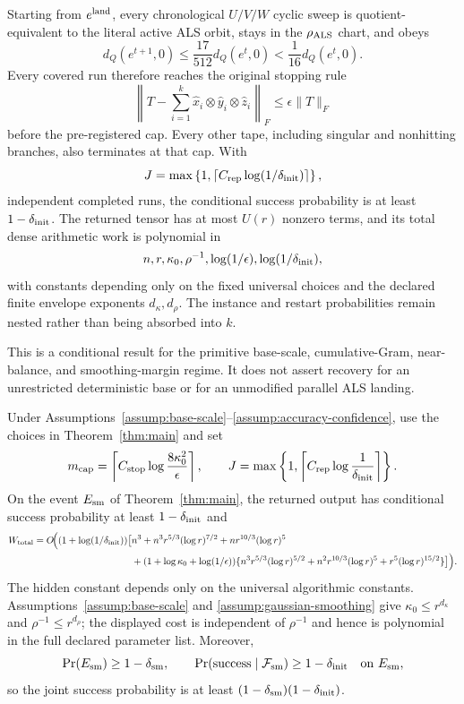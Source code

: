 \begin{theorem}
Starting from $e^{\rm land}$, every chronological $U/V/W$ cyclic sweep is
quotient-equivalent to the literal active ALS orbit, stays in the
$\rho_{\rm ALS}$ chart, and obeys
\[
 d_Q(e^{t+1},0)\le\frac{17}{512}d_Q(e^t,0)<\frac1{16}d_Q(e^t,0).
\]
Every covered run therefore reaches the original stopping rule
\[
 \left\|T-\sum_{i=1}^k
 \widehat x_i\otimes\widehat y_i\otimes\widehat z_i\right\|_F
 \le\epsilon\|T\|_F
\]
before the pre-registered cap. Every other tape, including singular and
nonhitting branches, also terminates at that cap. With
\[
 J=\max\left\{1,
 \left\lceil C_{\rm rep}\log(1/\delta_{\rm init})\right\rceil\right\},
\]
independent completed runs, the conditional success probability is at least
$1-\delta_{\rm init}$. The returned tensor has at most $U(r)$ nonzero terms,
and its total dense arithmetic work is polynomial in
\[
 n,r,\kappa _0,\rho^{-1},\log(1/\epsilon),
 \log(1/\delta_{\rm init}),
\]
with constants depending only on the fixed universal choices and the declared
finite envelope exponents $d_\kappa,d_\rho$. The instance and restart
probabilities remain nested rather than being absorbed into $k$.
\end{theorem}

This is a conditional result for the primitive base-scale, cumulative-Gram,
near-balance, and smoothing-margin regime. It does not assert recovery for an
unrestricted deterministic base or for an unmodified parallel ALS landing.

\begin{corollary}
\label{cor:rate-specialization-bridge}
Under Assumptions~\ref{assump:base-scale}--\ref{assump:accuracy-confidence},
use the choices in Theorem~\ref{thm:main} and set
\[
 m_{\rm cap}=\left\lceil C_{\rm stop}
 \log\frac{8\kappa _0^2}{\epsilon}\right\rceil,
 \qquad
 J=\max\left\{1,
 \left\lceil C_{\rm rep}\log\frac1{\delta_{\rm init}}\right\rceil\right\}.
\]
On the event $E_{\rm sm}$ of Theorem~\ref{thm:main}, the returned output has
conditional success probability at least $1-\delta_{\rm init}$ and
\[
\begin{aligned}
W_{\rm total}=O\!\Big((1+\log(1/\delta_{\rm init}))\big[&n^3
+n^3r^{5/3}(\log r)^{7/2}+nr^{10/3}(\log r)^5\\
&+(1+\log\kappa _0+\log(1/\epsilon))
\{n^3r^{5/3}(\log r)^{5/2}
+n^2r^{10/3}(\log r)^5+r^5(\log r)^{15/2}\}\big]\Big).
\end{aligned}
\]
The hidden constant depends only on the universal algorithmic constants.
Assumptions~\ref{assump:base-scale} and
\ref{assump:gaussian-smoothing} give
$\kappa _0\le r^{d_\kappa}$ and $\rho^{-1}\le r^{d_\rho}$; the displayed
cost is independent of $\rho^{-1}$ and hence is polynomial in the full
declared parameter list. Moreover,
\[
 \Pr(E_{\rm sm})\ge1-\delta_{\rm sm},\qquad
 \Pr(\mathrm{success}\mid\mathcal F_{\rm sm})\ge1-\delta_{\rm init}
 \quad\text{on }E_{\rm sm},
\]
so the joint success probability is at least
$(1-\delta_{\rm sm})(1-\delta_{\rm init})$.
\end{corollary}

